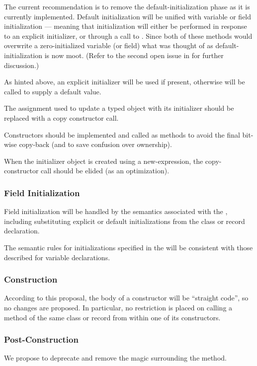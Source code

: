 The current recommendation is to remove the default-initialization phase as it is
currently implemented.  Default initialization will be unified with variable or field
initialization --- meaning that initialization will either be performed in response to
an explicit initializer, or through a call to .  Since both of these
methods would overwrite a zero-initialized variable (or field) what was thought of as
default-initialization is now moot.  (Refer to the second open issue in
 for further discussion.)

As hinted above, an explicit initializer will be used if present, otherwise
 will be called to supply a default value.

The assignment used to update a typed object with its initializer should be replaced with
a copy constructor call.

Constructors should be implemented and called as methods to avoid the final bit-wise
copy-back (and to save confusion over ownership).

When the initializer object is created using a new-expression, the copy-constructor call
should be elided (as an optimization).

\subsubsection{Field Initialization}

Field initialization will be handled by the semantics associated with the
, including substituting explicit or default initializations from
the class or record declaration.

The semantic rules for initializations specified in the  will be
consistent with those described for variable declarations.

\subsubsection{Construction}

According to this proposal, the body of a constructor will be ``straight code'', so no
changes are proposed.  In particular, no restriction is placed on calling a method of the
same class or record from within one of its constructors.

\subsubsection{Post-Construction}

We propose to deprecate and remove the magic surrounding the  method.
